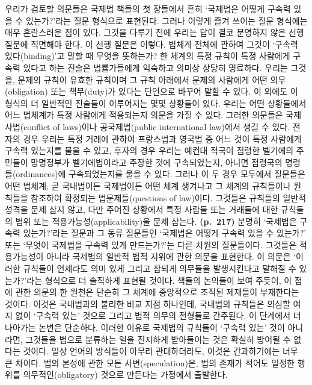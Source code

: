 우리가 검토할 의문들은 국제법 책들의 첫 장들에서 흔히 ‘국제법은 어떻게
구속력 있을 수 있는가?’라는 질문 형식으로 표현된다. 그러나 이렇게 즐겨
쓰이는 질문 형식에는 매우 혼란스러운 점이 있다. 그것을 다루기 전에
우리는 답이 결코 분명하지 않은 선행 질문에 직면해야 한다. 이 선행 질문은
이렇다. 법체계 전체에 관하여 그것이 ‘구속력 있다(binding)’고 말할 때
무엇을 뜻하는가? 한 체계의 특정 규칙이 특정 사람에게 구속력 있다고 하는
진술은 법률가들에게 익숙하고 의미상 상당히 명료하다. 우리는 그것을,
문제의 규칙이 유효한 규칙이며 그 규칙 아래에서 문제의 사람에게 어떤
의무(obligation) 또는 책무(duty)가 있다는 단언으로 바꾸어 말할 수 있다.
이 외에도 이 형식의 더 일반적인 진술들이 이루어지는 몇몇 상황들이 있다.
우리는 어떤 상황들에서 어느 법체계가 특정 사람에게 적용되는지 의문을
가질 수 있다. 그러한 의문들은 국제사법(conflict of laws)이나
공국제법(public international law)에서 생길 수 있다. 전자의 경우 우리는
특정 거래에 관하여 프랑스법과 영국법 중 어느 것이 특정 사람에게 구속력
있는지를 물을 수 있고, 후자의 경우 우리는 예컨대 적국이 점령한 벨기에의
주민들이 망명정부가 벨기에법이라고 주장한 것에 구속되었는지, 아니면
점령국의 명령들(ordinances)에 구속되었는지를 물을 수 있다. 그러나 이 두
경우 모두에서 질문들은 어떤 법체계, 곧 국내법이든 국제법이든 어떤 체계
 생겨나고 그 체계의 규칙들이나 원칙들을 참조하여
확정되는 법문제들(questions of law)이다. 그것들은 규칙들의 일반적 성격을
문제 삼지 않고, 다만 주어진 상황에서 특정 사람들 또는 거래들에 대한
규칙들의 범위 또는 적용가능성(applicability)을 문제 삼는다.
\textbf{(p.~217)} 분명히 ‘국제법은 구속력 있는가?’라는 질문과 그 동류
질문들인 ‘국제법은 어떻게 구속력 있을 수 있는가?’ 또는 ‘무엇이 국제법을
구속력 있게 만드는가?’는 다른 차원의 질문들이다. 그것들은 적용가능성이
아니라 국제법의 일반적 법적 지위에 관한 의문을 표현한다. 이 의문은
‘이러한 규칙들이 언제라도 의미 있게 그리고 참되게 의무들을 발생시킨다고
말해질 수 있는가?’라는 형식으로 더 솔직하게 표현될 것이다. 책들의
논의들이 보여 주듯이, 이 점에 관한 의문의 한 원천은 단순히 그 체계에
중앙적으로 조직된 제재들이 부재한다는 것이다. 이것은 국내법과의 불리한
비교 지점 하나인데, 국내법의 규칙들은 의심할 여지 없이 ‘구속력 있는’
것으로 그리고 법적 의무의 전형들로 간주된다. 이 단계에서 더 나아가는
논변은 단순하다. 이러한 이유로 국제법의 규칙들이 ‘구속력 있는’ 것이
아니라면, 그것들을 법으로 분류하는 일을 진지하게 받아들이는 것은 확실히
방어될 수 없다는 것이다. 일상 언어의 방식들이 아무리 관대하더라도,
이것은 간과하기에는 너무 큰 차이다. 법의 본성에 관한 모든
사변(speculation)은, 법의 존재가 적어도 일정한 행위를
의무적인(obligatory) 것으로 만든다는 가정에서 출발한다.

